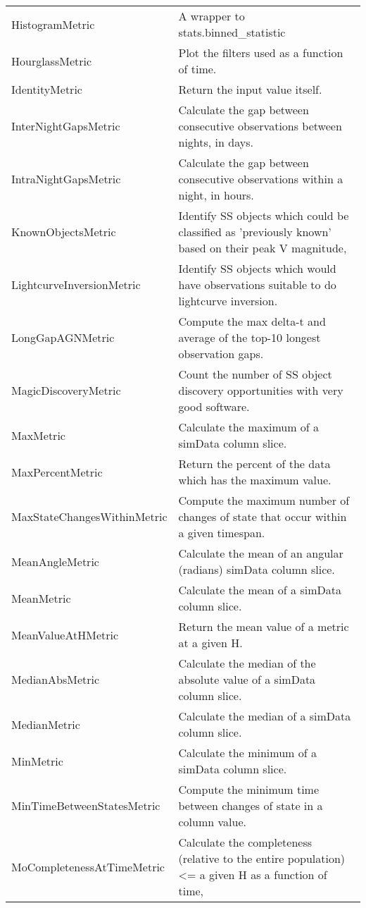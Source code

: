\begin{table}
\begin{tabular}{ll}
 HistogramMetric &  A wrapper to stats.binned\_statistic \\
 HourglassMetric &  Plot the filters used as a function of time. \\
 IdentityMetric &  Return the input value itself. \\
 InterNightGapsMetric &  Calculate the gap between consecutive observations between nights, in days. \\
 IntraNightGapsMetric &  Calculate the gap between consecutive observations within a night, in hours. \\
 KnownObjectsMetric &  Identify SS objects which could be classified as 'previously known' based on their peak V magnitude, \\
 LightcurveInversionMetric &  Identify SS objects which would have observations suitable to do lightcurve inversion. \\
 LongGapAGNMetric &  Compute the max delta-t and average of the top-10 longest observation gaps. \\
 MagicDiscoveryMetric &  Count the number of SS object discovery opportunities with very good software. \\
 MaxMetric &  Calculate the maximum of a simData column slice. \\
 MaxPercentMetric &  Return the percent of the data which has the maximum value. \\
 MaxStateChangesWithinMetric &  Compute the maximum number of changes of state that occur within a given timespan. \\
 MeanAngleMetric &  Calculate the mean of an angular (radians) simData column slice. \\
 MeanMetric &  Calculate the mean of a simData column slice. \\
 MeanValueAtHMetric &  Return the mean value of a metric at a given H. \\
 MedianAbsMetric &  Calculate the median of the absolute value of a simData column slice. \\
 MedianMetric &  Calculate the median of a simData column slice. \\
 MinMetric &  Calculate the minimum of a simData column slice. \\
 MinTimeBetweenStatesMetric &  Compute the minimum time between changes of state in a column value. \\
 MoCompletenessAtTimeMetric &  Calculate the completeness (relative to the entire population) <= a given H as a function of time, \\

\end{tabular}
\end{table}

